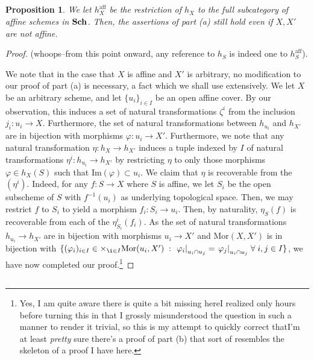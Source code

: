 \documentclass[english,letter,doublesided]{article}
\newcommand{\evat}[3]{\left. #1\right|_{#2}^{#3}}
\newcommand{\mor}{\mathrm{Mor}}
\newcommand{\prt}[1]{\setcounter{subsection}{#1-1}\subsection{}}
\newtheorem*{prop*}{Proposition}
\theoremstyle{remark}
\theoremstyle{definition}
\newcommand{\im}{\mathrm{Im}}
\newcommand{\cat}[1]{{\mathrm{\bf{#1}}}}
\newcommand{\restr}[2]{{\evat{#1}{#2}{}}}
\newcommand{\gph}{\varphi}
\newcommand{\csch}{\cat{Sch}}
\newcommand{\aff}{\mathrm{aff}}
\begin{document}
\prt{2}
\begin{prop*}
	We let $h_X^\aff$ be the restriction of $h_X$ to the full subcategory of affine schemes in $\csch$. Then, the assertions of part (a) still hold even if $X,X'$ are not affine.
\end{prop*}
\begin{proof} (whoops--from this point onward, any reference to $h_S$ is indeed one to $h_S^\aff$).
	
We note that in the case that $X$ is affine and $X'$ is arbitrary, no modification to our proof of part (a) is necessary, a fact which we shall use extensively. We let $X$ be an arbitrary scheme, and let $\{u_i\}_{i\in I}$ be an open affine cover. By our observation, this induces a set of natural transformations $\zeta^i$ from the inclusion $j_i:u_i\to X$. Furthermore, the set of natural transformations between $h_{u_i}$ and $h_{X'}$ are in bijection with morphisms $\gph:u_i\to X'$. Furthermore, we note that any natural transformation $\eta:h_X\to h_{X'}$ induces a tuple indexed by $I$ of natural transformations $\eta^i:h_{u_i}\to h_{X'}$ by restricting $\eta$ to only those morphisms $\gph\in h_X(S)$ such that $\im(\gph)\subset u_i$. We claim that $\eta$ is recoverable from the $(\eta^i)$. Indeed, for any $f:S\to X$ where $S$ is affine, we let $S_i$ be the open subscheme of $S$ with $f^{-1}(u_i)$ as underlying topological space. Then, we may restrict $f$ to $S_i$ to yield a morphism $f_i:S_i\to u_i$. Then, by naturality, $\eta_S(f)$ is recoverable from each of the $\eta^i_{S_i}(f_i)$. As the set of natural transformations $h_{u_i}\to h_{X'}$ are in bijection with morphisms $u_i\to X'$ and $\mor(X,X')$ is in bijection with $\{(\gph_i)_{i\in I}\in \times_{\i \in I} \mor(u_i,X')\;:\;\restr{\gph_i}{u_i\cap u_j}=\restr{\gph_j}{u_i\cap u_j}\;\forall\;i,j\in I\}$, we have now completed our proof.\footnote{Yes, I am quite aware there is quite a bit missing here\textemdash I realized only hours before turning this in that I grossly misunderstood the question in such a manner to render it trivial, so this is my attempt to quickly correct that\textemdash I'm at least \textit{pretty} sure there's a proof of part (b) that sort of resembles the skeleton of a proof I have here.}
\end{proof}
\prt{2}
\end{document}
